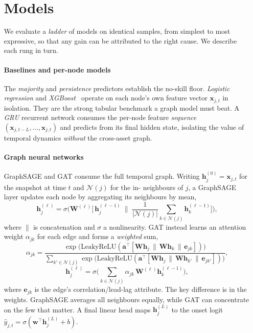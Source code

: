\documentclass[sigconf,anonymous]{acmart}
\begin{document}
\section{Models}\label{sec:models}
We evaluate a \emph{ladder} of models on identical samples, from simplest to most expressive, so
that any gain can be attributed to the right cause. We describe each rung in turn.

\paragraph{Baselines and per-node models} The \emph{majority} and \emph{persistence} predictors
establish the no-skill floor. \emph{Logistic regression} and \emph{XGBoost}~\cite{chen2016xgboost}
operate on each node's own feature vector $\mathbf{x}_{j,t}$ in isolation. They are the strong
tabular benchmark a graph model must beat. A \emph{GRU} recurrent network consumes the per-node
feature \emph{sequence} $(\mathbf{x}_{j,t-L},\dots,\mathbf{x}_{j,t})$ and predicts from its final
hidden state, isolating the value of temporal dynamics \emph{without} the cross-asset graph.

\paragraph{Graph neural networks} GraphSAGE and GAT consume the full temporal graph. Writing
$\mathbf{h}_j^{(0)}=\mathbf{x}_{j,t}$ for the snapshot at time $t$ and $\mathcal{N}(j)$ for the in-
neighbours of $j$, a GraphSAGE layer updates each node by aggregating its neighbours by mean,
\begin{equation}
\mathbf{h}_j^{(\ell)}=\sigma\!\Big(\mathbf{W}^{(\ell)}\big[\,\mathbf{h}_j^{(\ell-1)}\;\big\|\;
\textstyle\frac{1}{|\mathcal{N}(j)|}\sum_{k\in\mathcal{N}(j)}\mathbf{h}_k^{(\ell-1)}\big]\Big),
\end{equation}
where $\|$ is concatenation and $\sigma$ a nonlinearity. GAT instead learns an attention weight
$\alpha_{jk}$ for each edge and forms a \emph{weighted} sum,
\begin{equation}
\alpha_{jk}=\frac{\exp\!\big(\mathrm{LeakyReLU}(\mathbf{a}^\top[\mathbf{W}\mathbf{h}_j\,\|\,\mathbf{W}\mathbf{h}_k\,\|\,\mathbf{e}_{jk}])\big)}
{\sum_{k'\in\mathcal{N}(j)}\exp\!\big(\mathrm{LeakyReLU}(\mathbf{a}^\top[\mathbf{W}\mathbf{h}_j\,\|\,\mathbf{W}\mathbf{h}_{k'}\,\|\,\mathbf{e}_{jk'}])\big)},
\label{eq:gat}
\end{equation}
\begin{equation}
\mathbf{h}_j^{(\ell)}=\sigma\!\Big(\textstyle\sum_{k\in\mathcal{N}(j)}\alpha_{jk}\,\mathbf{W}^{(\ell)}\mathbf{h}_k^{(\ell-1)}\Big),
\end{equation}
where $\mathbf{e}_{jk}$ is the edge's correlation/lead-lag attribute. The key difference is in
the weights. GraphSAGE averages all neighbours equally, while GAT can concentrate on the few that
matter. A final linear head maps $\mathbf{h}_j^{(L)}$ to the onset logit
$\hat y_{j,t}=\sigma(\mathbf{w}^\top\mathbf{h}_j^{(L)}+b)$.
\end{document}
